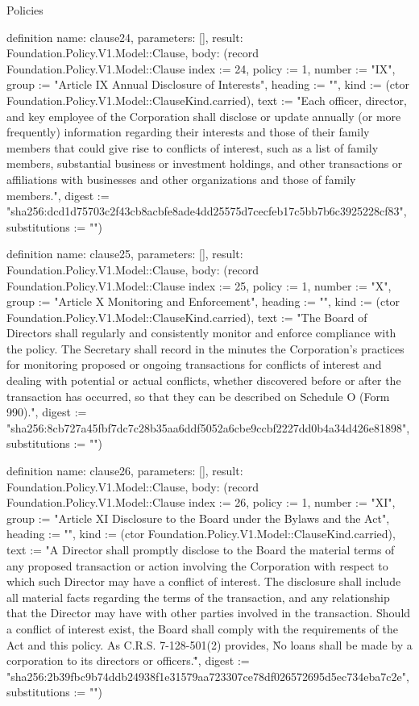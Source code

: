 \begin{lexlean}{Policies}
\begin{semanticmodule}
definition{
  name: clause24,
  parameters: [],
  result: Foundation.Policy.V1.Model::Clause,
  body: (record Foundation.Policy.V1.Model::Clause {index := 24, policy := 1, number := "IX", group := "Article IX Annual Disclosure of Interests", heading := "", kind := (ctor Foundation.Policy.V1.Model::ClauseKind.carried), text := "Each officer, director, and key employee of the Corporation shall disclose or update annually (or more frequently) information regarding their interests and those of their family members that could give rise to conflicts of interest, such as a list of family members, substantial business or investment holdings, and other transactions or affiliations with businesses and other organizations and those of family members.", digest := "sha256:dcd1d75703c2f43cb8acbfe8ade4dd25575d7cecfeb17c5bb7b6c3925228cf83", substitutions := ""})
}

definition{
  name: clause25,
  parameters: [],
  result: Foundation.Policy.V1.Model::Clause,
  body: (record Foundation.Policy.V1.Model::Clause {index := 25, policy := 1, number := "X", group := "Article X Monitoring and Enforcement", heading := "", kind := (ctor Foundation.Policy.V1.Model::ClauseKind.carried), text := "The Board of Directors shall regularly and consistently monitor and enforce compliance with the policy. The Secretary shall record in the minutes the Corporation's practices for monitoring proposed or ongoing transactions for conflicts of interest and dealing with potential or actual conflicts, whether discovered before or after the transaction has occurred, so that they can be described on Schedule O (Form 990).", digest := "sha256:8cb727a45fbf7dc7c28b35aa6ddf5052a6cbe9ccbf2227dd0b4a34d426e81898", substitutions := ""})
}

definition{
  name: clause26,
  parameters: [],
  result: Foundation.Policy.V1.Model::Clause,
  body: (record Foundation.Policy.V1.Model::Clause {index := 26, policy := 1, number := "XI", group := "Article XI Disclosure to the Board under the Bylaws and the Act", heading := "", kind := (ctor Foundation.Policy.V1.Model::ClauseKind.carried), text := "A Director shall promptly disclose to the Board the material terms of any proposed transaction or action involving the Corporation with respect to which such Director may have a conflict of interest. The disclosure shall include all material facts regarding the terms of the transaction, and any relationship that the Director may have with other parties involved in the transaction. Should a conflict of interest exist, the Board shall comply with the requirements of the Act and this policy. As C.R.S. 7-128-501(2) provides, \"No loans shall be made by a corporation to its directors or officers.\"", digest := "sha256:2b39fbc9b74ddb24938f1e31579aa723307ce78df026572695d5ec734eba7c2e", substitutions := ""})
}


\end{semanticmodule}
\end{lexlean}

